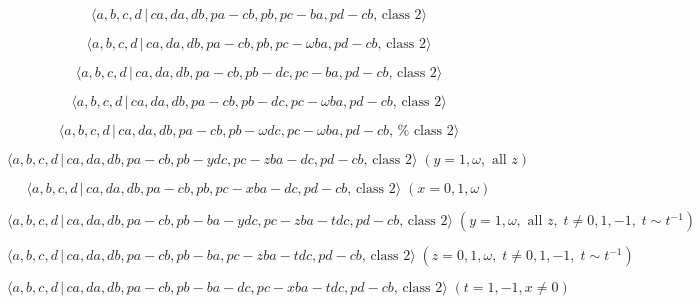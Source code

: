 \documentclass[10pt]{article}
\begin{document}
\begin{equation}
\langle a,b,c,d\,|\,ca,da,db,pa-cb,pb,pc-ba,pd-cb,\,\text{class }2\rangle 
\tag{7.3160}
\end{equation}

\begin{equation}
\langle a,b,c,d\,|\,ca,da,db,pa-cb,pb,pc-\omega ba,pd-cb,\,\text{class }%
2\rangle  \tag{7.3161}
\end{equation}

\begin{equation}
\langle a,b,c,d\,|\,ca,da,db,pa-cb,pb-dc,pc-ba,pd-cb,\,\text{class }2\rangle
\tag{7.3162}
\end{equation}

\begin{equation}
\langle a,b,c,d\,|\,ca,da,db,pa-cb,pb-dc,pc-\omega ba,pd-cb,\,\text{class }%
2\rangle  \tag{7.3163}
\end{equation}

\begin{equation}
\langle a,b,c,d\,|\,ca,da,db,pa-cb,pb-\omega dc,pc-\omega ba,pd-cb,\,\text{%
class }2\rangle  \tag{7.3164}
\end{equation}

\begin{equation}
\langle a,b,c,d\,|\,ca,da,db,pa-cb,pb-ydc,pc-zba-dc,pd-cb,\,\text{class }%
2\rangle \;(y=1,\omega ,\text{ all }z)  \tag{7.3165}
\end{equation}

\begin{equation}
\langle a,b,c,d\,|\,ca,da,db,pa-cb,pb,pc-xba-dc,pd-cb,\,\text{class }%
2\rangle \;(x=0,1,\omega )  \tag{7.3166}
\end{equation}

\begin{equation}
\langle a,b,c,d\,|\,ca,da,db,pa-cb,pb-ba-ydc,pc-zba-tdc,pd-cb,\,\text{class }%
2\rangle \;(y=1,\omega ,\text{ all }z,\;t\neq 0,1,-1,\;t\sim t^{-1}) 
\tag{7.3167}
\end{equation}

\begin{equation}
\langle a,b,c,d\,|\,ca,da,db,pa-cb,pb-ba,pc-zba-tdc,pd-cb,\,\text{class }%
2\rangle \;(z=0,1,\omega ,\;t\neq 0,1,-1,\;t\sim t^{-1})  \tag{7.3168}
\end{equation}

\begin{equation}
\langle a,b,c,d\,|\,ca,da,db,pa-cb,pb-ba-dc,pc-xba-tdc,pd-cb,\,\text{class }%
2\rangle \;(t=1,-1, x \neq 0)  \tag{7.3169}
\end{equation}
\end{document}
